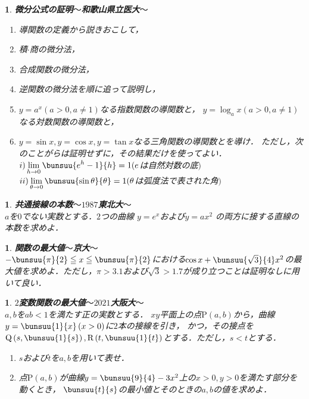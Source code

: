 \documentclass[10pt,
fleqn,
dvipdfmx,
uplatex
]{jsarticle}
\newtheorem{question}[Question]{}
\begin{document}
\begin{question}{\bf\boldmath 微分公式の証明$〜$和歌山県立医大$〜$}\\

\begin{enumerate}
\item 導関数の定義から説きおこして，
\item 積$\cdot$商の微分法，
\item 合成関数の微分法，
\item 逆関数の微分法を順に追って説明し，
\item $y=a^x\left(a>0, a\neq 1\right)$なる指数関数の導関数と，
$y=\log _ax\left(a>0,a\neq 1\right)$なる対数関数の導関数と，
\item $y=\sin x, y=\cos x, y=\tan x$なる三角関数の導関数とを導け．
ただし，次のことがらは証明せずに，その結果だけを使ってよい．
$i)\displaystyle\lim_{h\to 0}\bunsuu{{e^h-1}}{h}=1(e$は自然対数の底$)$
$ii)\displaystyle\lim_{\theta \to 0}\bunsuu{{\sin \theta }}{\theta }=1(\theta$は弧度法で表された角$)$
\end{enumerate}

\end{question}



\begin{question}{\bf\boldmath 共通接線の本数$〜1987$東北大$〜$}\\
$a$を$0$でない実数とする．$2$つの曲線
$y=e^x$および$y=ax^2$
の両方に接する直線の本数を求めよ．
\end{question}



\begin{question}{\bf\boldmath 関数の最大値$〜$京大$〜$}\\
$-\bunsuu{\pi }{2}\leqq x\leqq \bunsuu{\pi }{2}$における$\cos x+\bunsuu{{\sqrt 3}}{4}x^2$の最大値を求めよ．ただし，$\pi >3.1$および$\sqrt 3>1.7$が成り立つことは証明なしに用いて良い．
\end{question}



\begin{question}{\bf\boldmath $2$変数関数の最大値$〜2021$大阪大$〜$}\\
$a, b$を$ab<1$を満たす正の実数とする．
$xy$平面上の点$\text{P}\left(a,b\right)$から，曲線$y=\bunsuu{1}{x}\left(x>0\right)$に$2$本の接線を引き，
かつ，その接点を$\text{Q}\left(s,\bunsuu{1}{s}\right), \text{R}\left(t,\bunsuu{1}{t}\right)$とする．ただし，$s<t$とする．
\begin{enumerate}
\item $s$および$t$を$a, b$を用いて表せ．
\item 点$\text{P}\left(a,b\right)$が曲線$y=\bunsuu{9}{4}-3x^2$上の$x>0, y>0$を満たす部分を動くとき，
$\bunsuu{t}{s}$の最小値とそのときの$a, b$の値を求めよ．
\end{enumerate}

\end{question}
\end{document}

